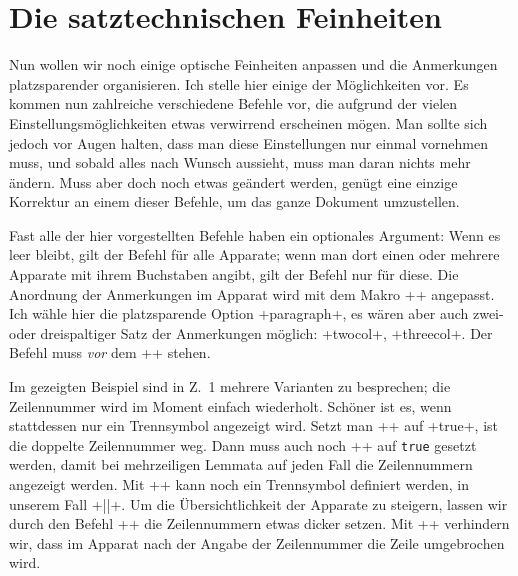 \section{Die satztechnischen Feinheiten}

Nun wollen wir noch einige optische Feinheiten anpassen und die Anmerkungen platzsparender organisieren. 
Ich stelle hier einige der Möglichkeiten vor. Es kommen nun zahlreiche verschiedene Befehle vor, 
die aufgrund der vielen Einstellungsmöglichkeiten etwas verwirrend erscheinen mögen. Man sollte 
sich jedoch vor Augen halten, dass man diese Einstellungen nur einmal vornehmen muss, 
und sobald alles nach Wunsch aussieht, 
muss man daran nichts mehr ändern. 
Muss aber doch noch etwas geändert werden, genügt eine
          einzige Korrektur an einem dieser Befehle, um das ganze
          Dokument umzustellen.

Fast alle der hier vorgestellten Befehle haben ein optionales Argument: Wenn es leer bleibt, gilt der Befehl für alle Apparate; wenn man dort einen oder 
mehrere Apparate mit ihrem Buchstaben angibt, gilt der Befehl nur für diese.
%
Die Anordnung der Anmerkungen im Apparat wird mit dem Makro ++ angepasst. 
Ich wähle hier die platzsparende Option +paragraph+, es wären aber auch zwei- oder dreispaltiger Satz der Anmerkungen möglich: +twocol+, +threecol+. Der Befehl muss \emph{vor} dem +\beginnumbering+ stehen. 

\begin{sloppypar}
Im gezeigten Beispiel sind in Z.~1 mehrere Varianten zu besprechen; die Zeilennummer wird 
im Moment einfach wiederholt. Schöner ist es, wenn stattdessen nur ein Trennsymbol 
angezeigt wird. Setzt man +\Xnumberonlyfirstinline[<app>][<bool>]+ auf +true+, ist die doppelte 
Zeilennummer weg. Dann muss auch noch +\Xnumberonlyfirstintwolines[<app>][<bool>]+ auf \texttt{true} 
gesetzt werden, damit bei mehrzeiligen Lemmata auf jeden Fall die Zeilennummern 
angezeigt werden. Mit ++ kann noch ein Trennsymbol 
definiert werden, in unserem Fall +||+.
%
Um die Übersichtlichkeit der Apparate zu steigern, lassen wir durch den Befehl 
++ die Zeilennummern etwas dicker setzen.
%
Mit +\Xnonbreakableafternumber[<app>]+ verhindern wir, dass im Apparat nach der Angabe der Zeilennummer die Zeile umgebrochen wird.
\end{sloppypar}


